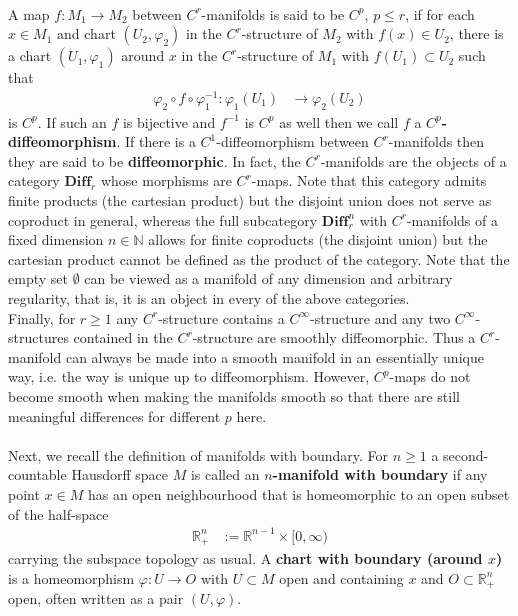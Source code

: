 \\
A map $f \colon M_{1} \to M_{2}$ between $C^{r}$-manifolds is said to be $C^{p}$, $p \leq r$, if for each $x \in M_{1}$ and chart $(U_{2},\varphi_{2})$ in the $C^{r}$-structure of $M_{2}$ with $f(x) \in U_{2}$, there is a chart $(U_{1},\varphi_{1})$ around $x$ in the $C^{r}$-structure of $M_{1}$ with $f(U_{1}) \subset U_{2}$ such that
\begin{align*}
  \varphi_{2}
  \circ
  f
  \circ
  \varphi_{1}^{-1}
  \colon
  \varphi_{1}(U_{1})
  &\to
  \varphi_{2}(U_{2})
\end{align*}
is $C^{p}$. If such an $f$ is bijective and $f^{-1}$ is $C^{p}$ as well then we call $f$ a \textbf{$C^{p}$-diffeomorphism}. If there is a $C^{1}$-diffeomorphism between $C^{r}$-manifolds then they are said to be \textbf{diffeomorphic}. In fact, the $C^{r}$-manifolds are the objects of a category $\mathbf{Diff}_{r}$ whose morphisms are $C^{r}$-maps. Note that this category admits finite products (the cartesian product) but the disjoint union does not serve as coproduct in general, whereas the full subcategory $\mathbf{Diff}_{r}^{n}$ with $C^{r}$-manifolds of a fixed dimension $n \in \mathbb{N}$ allows for finite coproducts (the disjoint union) but the cartesian product cannot be defined as the product of the category. Note that the empty set $\emptyset$ can be viewed as a manifold of any dimension and arbitrary regularity, that is, it is an object in every of the above categories.
\\
Finally, for $r \geq 1$ any $C^{r}$-structure contains a $C^{\infty}$-structure and any two $C^{\infty}$-structures contained in the $C^{r}$-structure are smoothly diffeomorphic. Thus a $C^{r}$-manifold can always be made into a smooth manifold in an essentially unique way, i.e. the way is unique up to diffeomorphism. However, $C^{p}$-maps do not become smooth when making the manifolds smooth so that there are still meaningful differences for different $p$ here.
\\\\
Next, we recall the definition of manifolds with boundary. For $n \geq 1$ a second-countable Hausdorff space $M$ is called an \textbf{$n$-manifold with boundary} if any point $x \in M$ has an open neighbourhood that is homeomorphic to an open subset of the half-space
\begin{align*}
  \mathbb{R}_{+}^{n}
  &:=
  \mathbb{R}^{n-1}
  \times
  [0,\infty)
\end{align*}
carrying the subspace topology as usual. A \textbf{chart with boundary (around $x$)} is a homeomorphism $\varphi \colon U \to O$ with $U \subset M$ open and containing $x$ and $O \subset \mathbb{R}_{+}^{n}$ open, often written as a pair $(U,\varphi)$.

